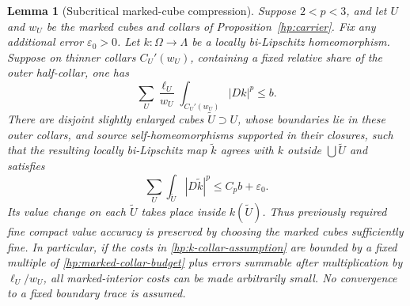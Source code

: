 \documentclass[11pt]{article}
\numberwithin{equation}{section}
\newtheorem{lemma}[theorem]{Lemma}
\theoremstyle{definition}
\theoremstyle{remark}
\begin{document}
\begin{lemma}[Subcritical marked-cube compression]\label{hp:hide-cubes}
Suppose $2<p<3$, and let $U$ and $w_U$ be the marked cubes and
collars of Proposition~\ref{hp:carrier}.  Fix any additional error
$\varepsilon_0>0$.  Let
$k:\Omega\to\Lambda$ be a locally bi-Lipschitz homeomorphism.
Suppose on thinner collars $C_U'(w_U)$, containing a fixed
relative share of the outer half-collar, one has
\begin{equation}\label{hp:k-collar-assumption}
 \sum_U\frac{\ell_U}{w_U}
        \int_{C_U'(w_U)}|Dk|^p\leq b.
\end{equation}
There are disjoint slightly enlarged cubes $\widetilde U\supset U$,
whose boundaries lie in these outer collars, and source
self-homeomorphisms supported in their closures, such that the
resulting locally bi-Lipschitz map $\widetilde k$ agrees with $k$
outside $\bigcup\widetilde U$ and satisfies
\begin{equation}\label{hp:hidden-cost}
 \sum_U\int_{\widetilde U}|D\widetilde k|^p
                \leq C_p b+\varepsilon_0.
\end{equation}
Its value change on each $\widetilde U$ takes place inside
$k(\widetilde U)$.  Thus previously required fine compact value
accuracy is preserved by choosing the marked cubes sufficiently
fine.  In particular, if the costs in
\eqref{hp:k-collar-assumption} are bounded by a fixed multiple of
\eqref{hp:marked-collar-budget} plus errors summable after
multiplication by $\ell_U/w_U$, all marked-interior costs can be
made arbitrarily small.  No convergence to a fixed boundary trace
is assumed.
\end{lemma}
\end{document}
